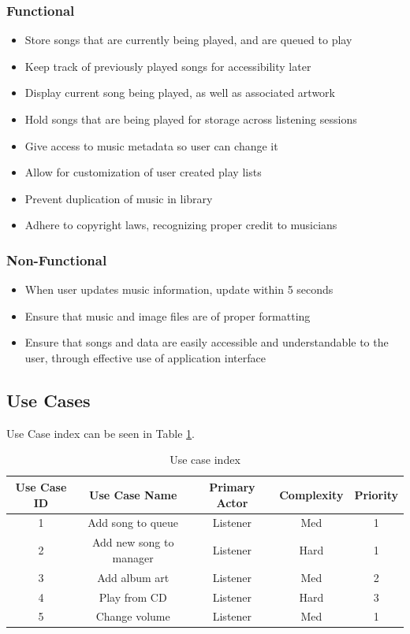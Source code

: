 \documentclass[10pt,conference,onecolumn,compsoc]{IEEEtran}
\begin{document}
\subsubsection{Functional}
\begin{itemize}
\item Store songs that are currently being played, and are queued to play
\item Keep track of previously played songs for accessibility later
\item Display current song being played, as well as associated artwork
\item Hold songs that are being played for storage across listening sessions
\item Give access to music metadata so user can change it
\item Allow for customization of user created play lists
\item Prevent duplication of music in library
\item Adhere to copyright laws, recognizing proper credit to musicians 
\end{itemize}

\subsubsection{Non-Functional}
\begin{itemize}
\item When user updates music information, update within 5 seconds
\item Ensure that music and image files are of proper formatting
\item Ensure that songs and data are easily accessible and understandable to the user, through effective use of application interface
\end{itemize}

\subsection{Use Cases}
Use Case index can be seen in Table \ref{tab:useCaseIndex}.




\begin{table}
\centering
\begin{tabular}{|c|c|c|c|c|}
\hline
Use Case ID & Use Case Name & Primary Actor & Complexity & Priority \\
\hline \hline
1 & Add song to queue & Listener & Med & 1\\
\hline
2 & Add new song to manager & Listener & Hard & 1\\
\hline
3 & Add album art & Listener & Med & 2\\
\hline
4 & Play from CD & Listener & Hard & 3\\
\hline
5 & Change volume & Listener & Med & 1\\
\hline

\end{tabular}
\caption{Use case index}
\label{tab:useCaseIndex}
\end{table}
\end{document}
